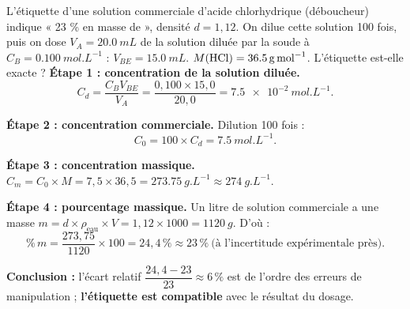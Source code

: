 \documentclass[11pt]{article}
\begin{document}
\begin{exoresolu}
L'étiquette d'une solution commerciale d'acide chlorhydrique (déboucheur) indique « 23 \% en masse de  », densité $d = 1{,}12$. On dilue cette solution 100 fois, puis on dose $V_A = \SI{20,0}{mL}$ de la solution diluée par la soude à $C_B = \SI{0,100}{mol.L^{-1}}$ : $V_{BE} = \SI{15,0}{mL}$. $M(\ce{HCl}) = \SI{36,5}{g.mol^{-1}}$. L'étiquette est-elle exacte ?
\tcblower
\textbf{Étape 1 : concentration de la solution diluée.}
\[ C_d = \frac{C_B V_{BE}}{V_A} = \frac{0{,}100 \times 15{,}0}{20{,}0} = \SI{7,5e-2}{mol.L^{-1}}. \]

\textbf{Étape 2 : concentration commerciale.} Dilution 100 fois :
\[ C_0 = 100 \times C_d = \SI{7,5}{mol.L^{-1}}. \]

\textbf{Étape 3 : concentration massique.} $C_m = C_0 \times M = 7{,}5 \times 36{,}5 = \SI{273,75}{g.L^{-1}} \approx \SI{274}{g.L^{-1}}$.

\textbf{Étape 4 : pourcentage massique.} Un litre de solution commerciale a une masse $m = d \times \rho_{\text{eau}} \times V = 1{,}12 \times 1000 = \SI{1120}{g}$. D'où :
\[ \%\,m = \frac{273{,}75}{1120}\times 100 = 24{,}4\,\% \approx 23\,\%\ \text{(à l'incertitude expérimentale près)}. \]

\textbf{Conclusion :} l'écart relatif $\dfrac{24{,}4 - 23}{23} \approx 6\,\%$ est de l'ordre des erreurs de manipulation ; \textbf{l'étiquette est compatible} avec le résultat du dosage.
\end{exoresolu}
\end{document}
